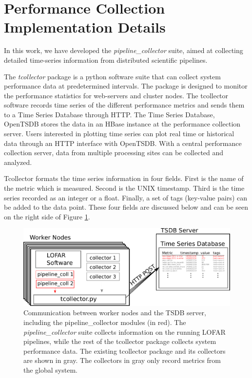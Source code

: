 \appendix

\section{Performance Collection Implementation Details}\label{appendix1}


In this work, we have developed the \textit{pipeline\_collector} suite, aimed at collecting detailed time-series information from distributed scientific pipelines. 

The \textit{tcollector} package is a python software suite that can collect system performance data at predetermined intervals. The package is designed to monitor the performance statistics for web-servers and cluster nodes. The tcollector software records time series of the different performance metrics and sends them to a Time Series Database through HTTP. The Time Series Database, OpenTSDB stores the data in an HBase \citep{hbase} instance at the performance collection server. Users interested in plotting time series can plot real time or historical data through an HTTP interface with OpenTSDB. With a central performance collection server, data from multiple processing sites can be collected and analyzed. 

Tcollector formats the time series information in four fields. First is the name of the metric which is measured. Second is the UNIX timestamp. Third is the time series recorded as an integer or a float. Finally, a set of tags (key-value pairs) can be added to the data point. These four fields are discussed below and can be seen on the right side of Figure \ref{fig:tsdb_tcollector}. 

\begin{figure}[!h]
    \includegraphics[width=\linewidth]{ch4/figures/figA14/TSDB_tcollector.pdf}
      \caption{Communication between worker nodes and the TSDB server, including the pipeline\_collector modules (in red). The \textit{pipeline\_collector} suite collects information on the running LOFAR pipelines, while the rest of the tcollector package collects system performance data. The existing tcollector package and its collectors are shown in gray. The collectors in gray only record metrics from the global system. }
	\label{fig:tsdb_tcollector}
\end{figure}

